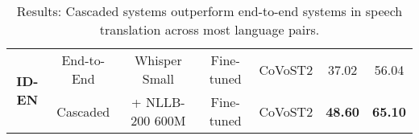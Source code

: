 \begin{table*}[ht]
\begin{tabular}{@{}ccccccc@{}}
\multirow{2}{*}{\textbf{ID-EN}} & End-to-End & Whisper Small       & Fine-tuned          &                                  CoVoST2    & 37.02	      &         56.04          \\
                                & Cascaded   & + NLLB-200 600M     & Fine-tuned          & CoVoST2    &  \textbf{48.60}   &	\textbf{65.10} \\
                                \bottomrule
\end{tabular}
\caption{Results: Cascaded systems outperform end-to-end systems in speech translation across most language pairs.}
\label{tab:results}
\end{table*}
